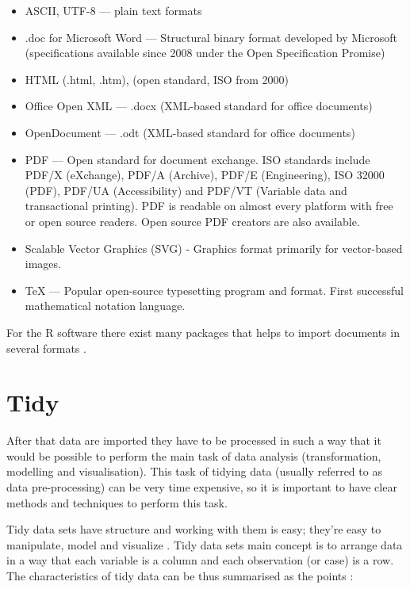 \documentclass[]{book}
\providecommand{\tightlist}{%
  \setlength{\itemsep}{0pt}\setlength{\parskip}{0pt}}
\begin{document}
\begin{itemize}
\tightlist
\item
  ASCII, UTF-8 --- plain text formats
\item
  .doc for Microsoft Word --- Structural binary format developed by
  Microsoft (specifications available since 2008 under the Open
  Specification Promise)
\item
  HTML (.html, .htm), (open standard, ISO from 2000)
\item
  Office Open XML --- .docx (XML-based standard for office documents)
\item
  OpenDocument --- .odt (XML-based standard for office documents)
\item
  PDF --- Open standard for document exchange. ISO standards include
  PDF/X (eXchange), PDF/A (Archive), PDF/E (Engineering), ISO 32000
  (PDF), PDF/UA (Accessibility) and PDF/VT (Variable data and
  transactional printing). PDF is readable on almost every platform with
  free or open source readers. Open source PDF creators are also
  available.
\item
  Scalable Vector Graphics (SVG) - Graphics format primarily for
  vector-based images.
\item
  TeX --- Popular open-source typesetting program and format. First
  successful mathematical notation language.
\end{itemize}

For the R software there exist many packages that helps to import
documents in several formats \citep{readr2017r}.

\section{Tidy}\label{sotatoolstidy}

After that data are imported they have to be processed in such a way
that it would be possible to perform the main task of data analysis
(transformation, modelling and visualisation). This task of tidying data
(usually referred to as data pre-processing) can be very time expensive,
so it is important to have clear methods and techniques to perform this
task.

Tidy data sets have structure and working with them is easy; they're
easy to manipulate, model and visualize \citep{wickham2014tidy}. Tidy
data sets main concept is to arrange data in a way that each variable is
a column and each observation (or case) is a row. The characteristics of
tidy data can be thus summarised as the points \citep{leek2015elements}:
\end{document}
